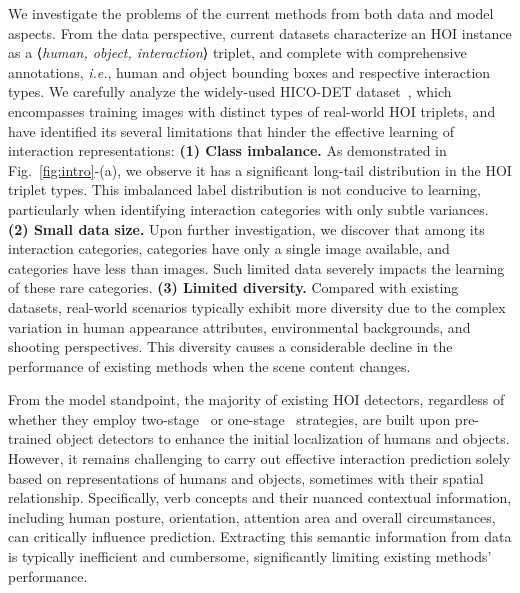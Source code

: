 \documentclass{article}
\begin{document}
We investigate the problems of the current methods from both data and model aspects.
From the data perspective, current datasets characterize an HOI instance as a ⟨\textit{human, object, interaction}⟩ triplet, and complete with comprehensive annotations, \textit{i.e.}, human and object bounding boxes and respective interaction types. 
We carefully analyze the widely-used HICO-DET dataset~\cite{chao:wacv2018}, which encompasses  training images with  distinct types of real-world HOI triplets, and have identified its several limitations that hinder the effective learning of interaction representations:
\textbf{(1) Class imbalance.} As demonstrated in Fig.~\ref{fig:intro}-(a), we observe it has a significant long-tail distribution in the HOI triplet types. This imbalanced label distribution is not conducive to learning, particularly when identifying interaction categories with only subtle variances. 
\textbf{(2) Small data size.} Upon further investigation, we discover that among its  interaction categories,  categories have only a single image available, and  categories have less than  images. Such limited data severely impacts the learning of these rare categories.
\textbf{(3) Limited diversity.} Compared with existing datasets, real-world scenarios typically exhibit more diversity due to the complex variation in human appearance attributes, environmental backgrounds, and shooting perspectives. This diversity causes a considerable decline in the performance of existing methods when the scene content changes.


From the model standpoint, the majority of existing HOI detectors, regardless of whether they employ two-stage~\cite{chao2018learning,gao2018ican,gupta2019no,hou2020visual,wan2019pose} or one-stage~\cite{liao2020ppdm,wang2020learning,kim2020uniondet,liao2022gen,wu2022mining,zhang2021mining,zhou2022human} strategies, are built upon pre-trained object detectors to enhance the initial localization of humans and objects. 
However, it remains challenging to carry out effective interaction prediction solely based on representations of humans and objects, sometimes with their spatial relationship. 
Specifically, verb concepts and their nuanced contextual information, including human posture, orientation, attention area and overall circumstances, can critically influence prediction.
Extracting this semantic information from data is typically inefficient and cumbersome, significantly limiting existing methods' performance.
\end{document}
